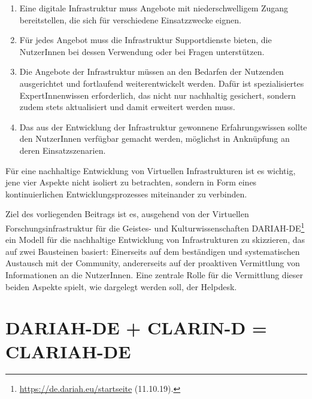 \documentclass[a4paper,
fontsize=11pt,
oneside,
numbers=noperiodatend,
parskip=half-,
bibliography=totoc,
final
]{scrartcl}
\begin{document}
\begin{enumerate}
\def\labelenumi{\arabic{enumi}.}
\item
  Eine digitale Infrastruktur muss Angebote mit niederschwelligem Zugang
  bereitstellen, die sich für verschiedene Einsatzzwecke eignen.
\item
  Für jedes Angebot muss die Infrastruktur Supportdienste bieten, die
  NutzerInnen bei dessen Verwendung oder bei Fragen unterstützen.
\item
  Die Angebote der Infrastruktur müssen an den Bedarfen der Nutzenden
  ausgerichtet und fortlaufend weiterentwickelt werden. Dafür ist
  spezialisiertes ExpertInnenwissen erforderlich, das nicht nur
  nachhaltig gesichert, sondern zudem stets aktualisiert und damit
  erweitert werden muss.
\item
  Das aus der Entwicklung der Infrastruktur gewonnene Erfahrungswissen
  sollte den NutzerInnen verfügbar gemacht werden, möglichst in
  Anknüpfung an deren Einsatzszenarien.
\end{enumerate}

Für eine nachhaltige Entwicklung von Virtuellen Infrastrukturen ist es
wichtig, jene vier Aspekte nicht isoliert zu betrachten, sondern in Form
eines kontinuierlichen Entwicklungsprozesses miteinander zu verbinden.

Ziel des vorliegenden Beitrags ist es, ausgehend von der Virtuellen
Forschungsinfrastruktur für die Geistes- und Kulturwissenschaften
DARIAH-DE\footnote{\url{https://de.dariah.eu/startseite} (11.10.19).}
ein Modell für die nachhaltige Entwicklung von Infrastrukturen zu
skizzieren, das auf zwei Bausteinen basiert: Einerseits auf dem
beständigen und systematischen Austausch mit der Community, andererseits
auf der proaktiven Vermittlung von Informationen an die NutzerInnen.
Eine zentrale Rolle für die Vermittlung dieser beiden Aspekte spielt,
wie dargelegt werden soll, der Helpdesk.

\hypertarget{dariah-de-clarin-d-clariah-de}{%
\section{DARIAH-DE + CLARIN-D =
CLARIAH-DE}\label{dariah-de-clarin-d-clariah-de}}
\end{document}
